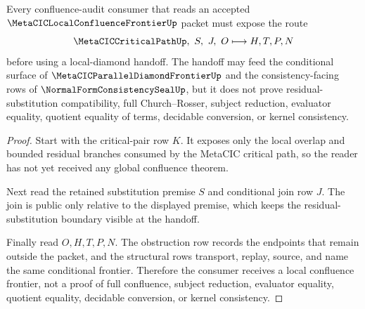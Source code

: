 \begin{theorem}
\label{thm:metacic-local-confluence-frontier-conditional-handoff}
Every confluence-audit consumer that reads an accepted $\MetaCICLocalConfluenceFrontierUp$ packet must expose the route
$$
\MetaCICCriticalPathUp,\ S,\ J,\ O
\longmapsto
H,T,P,N
$$
before using a local-diamond handoff. The handoff may feed the conditional surface of $\MetaCICParallelDiamondFrontierUp$ and the consistency-facing rows of $\NormalFormConsistencySealUp$, but it does not prove residual-substitution compatibility, full Church--Rosser, subject reduction, evaluator equality, quotient equality of terms, decidable conversion, or kernel consistency.
\end{theorem}
\begin{proof}
Start with the critical-pair row $K$. It exposes only the local overlap and bounded residual branches consumed by the MetaCIC critical path, so the reader has not yet received any global confluence theorem.

Next read the retained substitution premise $S$ and conditional join row $J$. The join is public only relative to the displayed premise, which keeps the residual-substitution boundary visible at the handoff.

Finally read $O,H,T,P,N$. The obstruction row records the endpoints that remain outside the packet, and the structural rows transport, replay, source, and name the same conditional frontier. Therefore the consumer receives a local confluence frontier, not a proof of full confluence, subject reduction, evaluator equality, quotient equality, decidable conversion, or kernel consistency.
\end{proof}


